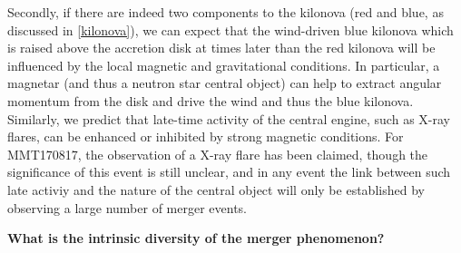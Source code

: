Secondly, if there are indeed two components to the kilonova (red and blue, as discussed in \ref{kilonova}), we can expect that the wind-driven blue kilonova which is raised above the accretion disk at times later than the red kilonova will be influenced by the local magnetic and gravitational conditions. In particular, a magnetar (and thus a neutron star central object) can help to extract angular momentum from the disk and drive the wind and thus the blue kilonova. Similarly, we predict that late-time activity of the central engine, such as X-ray flares, can be enhanced or inhibited by strong magnetic conditions. For MMT170817, the observation of a X-ray flare has been claimed, though the significance of this event is still unclear, and in any event the link between such late activiy and the nature of the central object will only be established by observing a large number of merger events.


\bf{What is the intrinsic diversity of the merger phenomenon? }
